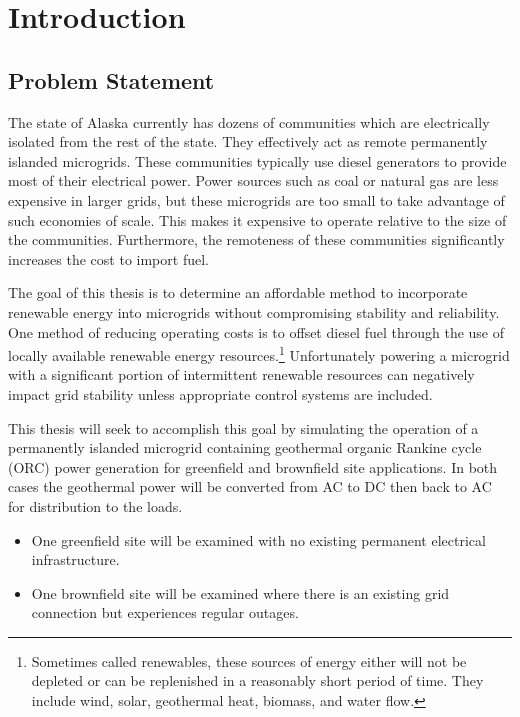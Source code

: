 \chapter{Introduction}
\label{ch:intro}

\section{Problem Statement}
The state of Alaska currently has dozens of communities which are electrically isolated from the rest of the state. They effectively act as remote permanently islanded microgrids. These communities typically use diesel generators to provide most of their electrical power. Power sources such as coal or natural gas are less expensive in larger grids, but these microgrids are too small to take advantage of such economies of scale. This makes it expensive to operate relative to the size of the communities. Furthermore, the remoteness of these communities significantly increases the cost to import fuel.

The goal of this thesis is to determine an affordable method to incorporate renewable energy into microgrids without compromising stability and reliability. One method of reducing operating costs is to offset diesel fuel through the use of locally available renewable energy resources.\footnote{Sometimes called renewables, these sources of energy either will not be depleted or can be replenished in a reasonably short period of time. They include wind, solar, geothermal heat, biomass, and water flow.} Unfortunately powering a microgrid with a significant portion of intermittent renewable resources can negatively impact grid stability unless appropriate control systems are included. 

This thesis will seek to accomplish this goal by simulating the operation of a permanently islanded microgrid containing geothermal organic Rankine cycle (ORC) power generation for greenfield and brownfield site applications. In both cases the geothermal power will be converted from AC to DC then back to AC for distribution to the loads.
\begin{itemize}
\item One greenfield site will be examined with no existing permanent electrical infrastructure.
\item One brownfield site will be examined where there is an existing grid connection but experiences regular outages.
\end{itemize}

